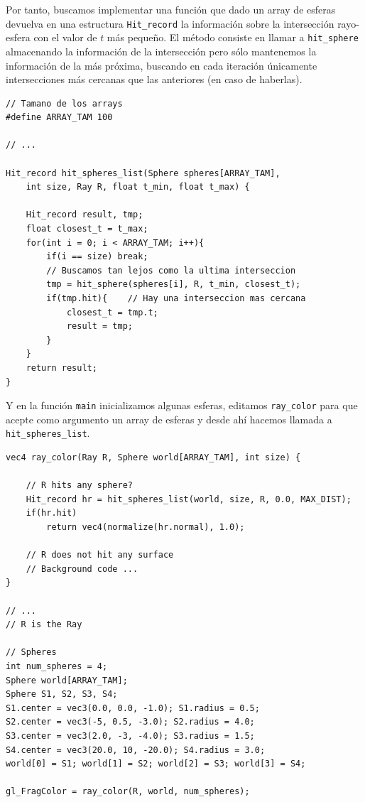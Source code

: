 Por tanto, buscamos implementar una función que dado un array de esferas devuelva en una estructura \verb|Hit_record| la información sobre la intersección rayo-esfera con el valor de $t$ más pequeño. El método consiste en llamar a \verb|hit_sphere| almacenando la información de la intersección pero sólo mantenemos la información de la más próxima, buscando en cada iteración únicamente intersecciones más cercanas que las anteriores (en caso de haberlas).
\begin{lstlisting}
// Tamano de los arrays
#define ARRAY_TAM 100

// ... 

Hit_record hit_spheres_list(Sphere spheres[ARRAY_TAM], 
    int size, Ray R, float t_min, float t_max) {

    Hit_record result, tmp;
    float closest_t = t_max;
    for(int i = 0; i < ARRAY_TAM; i++){
        if(i == size) break;
        // Buscamos tan lejos como la ultima interseccion
        tmp = hit_sphere(spheres[i], R, t_min, closest_t);
        if(tmp.hit){    // Hay una interseccion mas cercana
            closest_t = tmp.t;
            result = tmp;
        }
    }
    return result;
}
\end{lstlisting} 

Y en la función \verb|main| inicializamos algunas esferas, editamos \verb|ray_color| para que acepte como argumento un array de esferas y desde ahí hacemos llamada a \verb|hit_spheres_list|.

\begin{lstlisting}
vec4 ray_color(Ray R, Sphere world[ARRAY_TAM], int size) {

    // R hits any sphere?
    Hit_record hr = hit_spheres_list(world, size, R, 0.0, MAX_DIST);
    if(hr.hit)
        return vec4(normalize(hr.normal), 1.0);

    // R does not hit any surface
    // Background code ... 
}

// ... 
// R is the Ray

// Spheres
int num_spheres = 4;
Sphere world[ARRAY_TAM];
Sphere S1, S2, S3, S4;
S1.center = vec3(0.0, 0.0, -1.0); S1.radius = 0.5; 
S2.center = vec3(-5, 0.5, -3.0); S2.radius = 4.0;
S3.center = vec3(2.0, -3, -4.0); S3.radius = 1.5;
S4.center = vec3(20.0, 10, -20.0); S4.radius = 3.0;
world[0] = S1; world[1] = S2; world[2] = S3; world[3] = S4;

gl_FragColor = ray_color(R, world, num_spheres);

\end{lstlisting}

